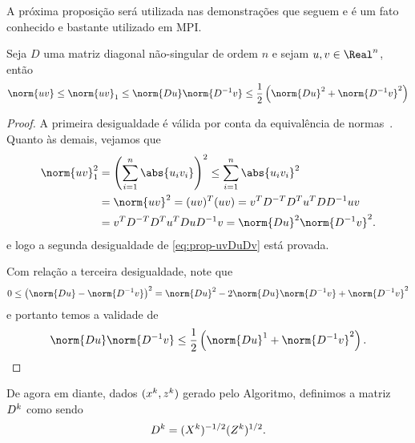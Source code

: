 
A próxima proposição será utilizada nas demonstrações que seguem e é um fato conhecido e bastante utilizado em \ac{MPI}.

\begin{prop}\label{prop:norm-uv}
	Seja $D$ uma matriz diagonal não-singular de ordem $n$ e sejam $u,v\in\Real^n$, então 
	\begin{equation}
		\label{eq:prop-uvDuDv}
		\norm{uv}\leq \norm{uv}_1 \leq \norm{Du}\norm{D^{-1}v} \leq \frac{1}{2}\left(\norm{Du}^{2} + \norm{D^{-1}v}^{2}\right)
	\end{equation}
\end{prop}
\begin{proof} A primeira desigualdade é válida por conta da equivalência de normas~\cite[p.~53]{Golub:1996wp}. Quanto às demais, vejamos que 
\[
	\begin{aligned}
		\norm{uv}_1^{2} & = \left( \sum_{i=1}^{n}\abs{u_i v_i}  \right)^{2} \leq  \sum_{i=1}^{n}\abs{u_iv_i}^{2}\\
						& = \norm{uv}^{2} = (uv)^{T}(uv)  = v^{T}D^{-T}D^{T}u^{T}DD^{-1} uv\\
						& = v^{T}D^{-T}D^{T}u^{T}DuD^{-1}v = \norm{Du}^{2}\norm{D^{-1}v}^{2}.
	\end{aligned}
	\]
e logo a segunda desigualdade de \eqref{eq:prop-uvDuDv} está provada. 

Com relação a terceira desigualdade, note que  
\[
0 \leq \left(\norm{Du} - \norm{D^{-1}v}\right)^{2} = \norm{Du}^{2} - 2\norm{Du}\norm{D^{-1}v} + \norm{D^{-1}v}^{2}
\]
e portanto temos a validade de
\[
\norm{Du}\norm{D^{-1}v} \leq \frac{1}{2}\left(\norm{Du}^{1} + \norm{D^{-1}v}^{2}\right). \qedhere
\]
\end{proof}

De agora em diante, dados $(x^{k},z^{k})$ gerado pelo Algoritmo, definimos a matriz $D^{k}$ como sendo
\[
D^{k} =(X^{k})^{-1/2}(Z^{k})^{1/2}.
\]

